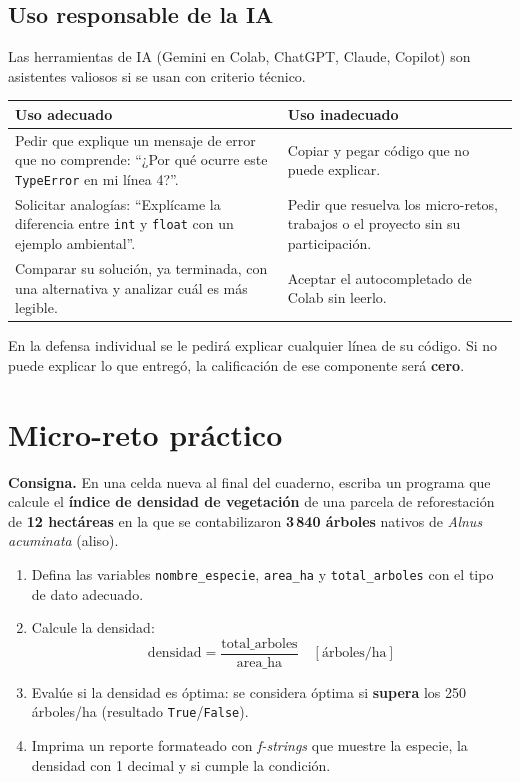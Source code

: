 \documentclass[11pt,a4paper]{article}
\newcommand{\code}[1]{\texttt{#1}}
\begin{document}
\subsection{Uso responsable de la IA}
Las herramientas de IA (Gemini en Colab, ChatGPT, Claude, Copilot) son asistentes valiosos si se usan con criterio técnico.

\begin{center}
\renewcommand{\arraystretch}{1.35}
\begin{tabularx}{\textwidth}{X X}
\toprule
\textbf{\color{tealProfundo}Uso adecuado} & \textbf{\color{alerta}Uso inadecuado} \\
\midrule
Pedir que explique un mensaje de error que no comprende: ``¿Por qué ocurre este \code{TypeError} en mi línea 4?''. &
Copiar y pegar código que no puede explicar. \\
Solicitar analogías: ``Explícame la diferencia entre \code{int} y \code{float} con un ejemplo ambiental''. &
Pedir que resuelva los micro-retos, trabajos o el proyecto sin su participación. \\
Comparar su solución, ya terminada, con una alternativa y analizar cuál es más legible. &
Aceptar el autocompletado de Colab sin leerlo. \\
\bottomrule
\end{tabularx}
\end{center}

\begin{crit}
En la defensa individual se le pedirá explicar cualquier línea de su código. Si no puede explicar lo que entregó, la calificación de ese componente será \textbf{cero}.
\end{crit}

\section{Micro-reto práctico}

\textbf{Consigna.} En una celda nueva al final del cuaderno, escriba un programa que calcule el \textbf{índice de densidad de vegetación} de una parcela de reforestación de \textbf{12 hectáreas} en la que se contabilizaron \textbf{3\,840 árboles} nativos de \emph{Alnus acuminata} (aliso).

\begin{enumerate}
  \item Defina las variables \code{nombre\_especie}, \code{area\_ha} y \code{total\_arboles} con el tipo de dato adecuado.
  \item Calcule la densidad:
  \[
  \text{densidad} = \frac{\text{total\_arboles}}{\text{area\_ha}} \quad [\text{árboles/ha}]
  \]
  \item Evalúe si la densidad es óptima: se considera óptima si \textbf{supera} los 250 árboles/ha (resultado \code{True}/\code{False}).
  \item Imprima un reporte formateado con \emph{f-strings} que muestre la especie, la densidad con 1 decimal y si cumple la condición.
\end{enumerate}
\end{document}

